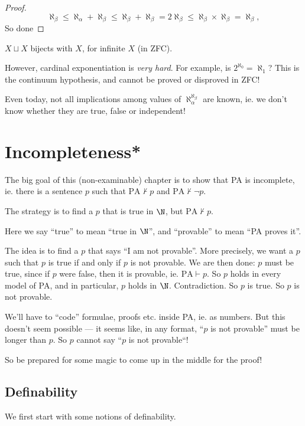 \documentclass[a4paper]{article}
\begin{document}
\begin{proof}
  \[
    \aleph_\beta \leq \aleph_\alpha + \aleph_\beta \leq \aleph_\beta + \aleph_\beta = 2\aleph_\beta \leq \aleph_\beta\times \aleph_\beta = \aleph_\beta,
  \]
  So done
\end{proof}

\begin{eg}
  $X\sqcup X$ bijects with $X$, for infinite $X$ (in ZFC).
\end{eg}

However, cardinal exponentiation is \emph{very hard}. For example, is $2^{\aleph_0} = \aleph_1$? This is the continuum hypothesis, and cannot be proved or disproved in ZFC!

Even today, not all implications among values of $\aleph_\alpha^{\aleph_\beta}$ are known, ie. we don't know whether they are true, false or independent!
\section{Incompleteness*}
The big goal of this (non-examinable) chapter is to show that PA is incomplete, ie. there is a sentence $p$ such that $\mathrm{PA}\not\vdash p$ and $\mathrm{PA}\not\vdash \neg p$.

The strategy is to find a $p$ that is true in $\N$, but $\mathrm{PA}\not\vdash p$.

Here we say ``true'' to mean ``true in $\N$'', and ``provable'' to mean ``PA proves it''.

The idea is to find a $p$ that says ``I am not provable''. More precisely, we want a $p$ such that $p$ is true if and only if $p$ is not provable. We are then done: $p$ must be true, since if $p$ were false, then it is provable, ie. $\mathrm{PA}\vdash p$. So $p$ holds in every model of PA, and in particular, $p$ holds in $\N$. Contradiction. So $p$ is true. So $p$ is not provable.

We'll have to ``code'' formulae, proofs etc. inside PA, ie. as numbers. But this doesn't seem possible --- it seems like, in any format, ``$p$ is not provable'' must be longer than $p$. So $p$ cannot say ``$p$ is not provable``!

So be prepared for some magic to come up in the middle for the proof!

\subsection*{Definability}
We first start with some notions of definability.
\end{document}
